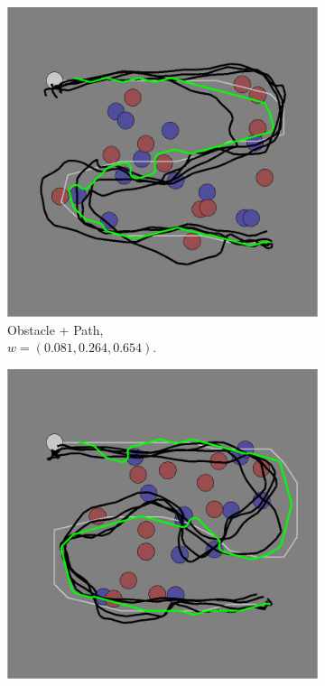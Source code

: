 \begin{figure}[h]
\begin{subfigure}[b]{0.24\textwidth}
\includegraphics[width=\textwidth]{task_2.png}
\caption{Obstacle + Path,\\$w = (0.081, 0.264, 0.654)$. }
\end{subfigure}
\begin{subfigure}[b]{0.24\textwidth}
\includegraphics[width=\textwidth]{task_3.png}

\end{subfigure}
\end{figure}
